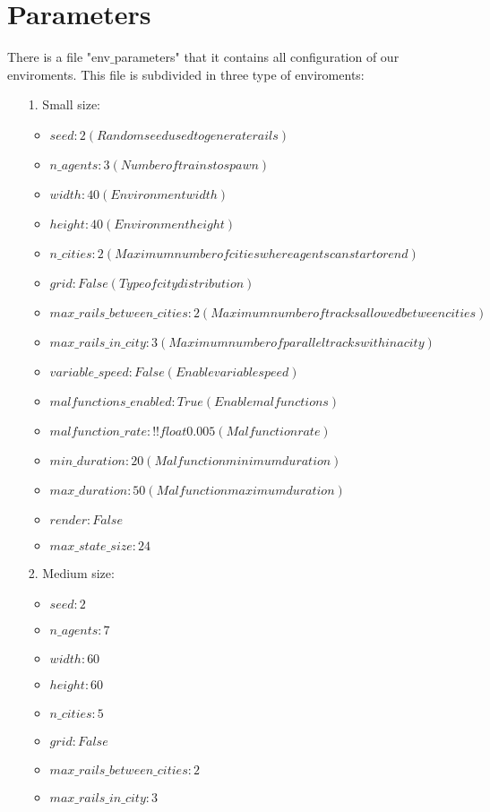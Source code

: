 \section{Parameters}
There is a file "env$\_$parameters" that it contains all configuration of our enviroments. This file is subdivided in three type of enviroments:
\begin{enumerate}
	\item [1.] Small size:
	\begin{itemize}
		\item $seed: 2 (Random seed used to generate rails)$
		\item $n\_agents: 3 (Number of trains to spawn)$
		\item $width: 40 (Environment width)$
		\item $height: 40 (Environment height)$
		\item $n\_cities: 2 (Maximum number of cities where agents can start or end)$
		\item $grid: False (Type of city distribution)$
		\item $max\_rails\_between\_cities: 2 (Maximum number of tracks allowed between cities)$
		\item $max\_rails\_in\_city: 3 (Maximum number of parallel tracks within a city)$
		\item  $variable\_speed: False (Enable variable speed)$
		\item $malfunctions\_enabled: True (Enable malfunctions)$ 
		\item $malfunction\_rate: !!float 0.005 (Malfunction rate)$
		\item $min\_duration: 20 (Malfunction minimum duration)$
		\item $max\_duration: 50 (Malfunction maximum duration)$
		\item $render: False$
		\item $max\_state\_size: 24$
	\end{itemize}
	\item [2.] Medium size:
		\begin{itemize}
		\item $seed: 2$
		\item $n\_agents: 7 $
		\item $width: 60 $
		\item $height: 60 $
		\item $n\_cities: 5 $
		\item $grid: False $
		\item $max\_rails\_between\_cities: 2 $
		\item $max\_rails\_in\_city: 3 $

\end{itemize}
\end{enumerate}
